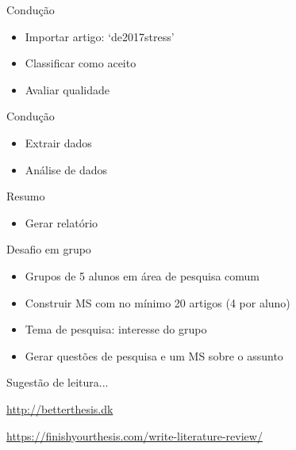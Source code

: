\begin{frame}
\begin{block}{Condução}
\begin{itemize}
\item Importar artigo: `de2017stress'
\item Classificar como aceito
\item Avaliar qualidade
\end{itemize}
\end{block}

\begin{block}{Condução}
\begin{itemize}
\item Extrair dados
\item Análise de dados
\end{itemize}
\end{block}

\begin{block}{Resumo}
\begin{itemize}
\item Gerar relatório
\end{itemize}
\end{block}
\end{frame}

\begin{frame}{Desafio em grupo}
\begin{itemize}
\item Grupos de 5 alunos em área de pesquisa comum
\item Construir MS com no mínimo 20 artigos (4 por aluno)
\item Tema de pesquisa: interesse do grupo
\item Gerar questões de pesquisa e um MS sobre o assunto
\end{itemize}
\end{frame}



\begin{frame}{Sugestão de leitura...}

\url{http://betterthesis.dk} 

\url{https://finishyourthesis.com/write-literature-review/}

\end{frame}

